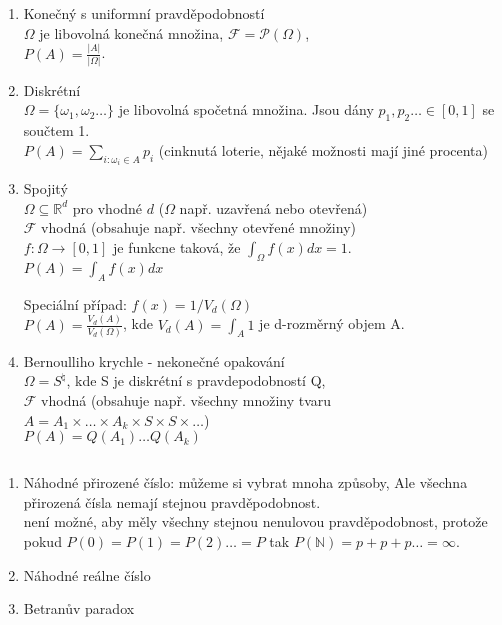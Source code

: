 \documentclass[../main.tex]{subfiles}
\begin{document}
\begin{example}
    $ $\\
    \begin{enumerate}
        \item 
        Konečný s uniformní pravděpodobností\\
        $\Omega$ je libovolná konečná množina, $\mathcal{F} = \mathcal{P}(\Omega)$,\\
        $P(A) = \frac{|A|}{|\Omega|}$.
        \item 
        Diskrétní\\
        $\Omega = \{\omega_1,\omega_2\dots\}$ je libovolná spočetná množina. Jsou dány $p_1,p_2\dots \in [0,1]$ se součtem 1.\\
        $P(A) = \sum_{i:\omega_i \in A} p_i$ (cinknutá loterie, nějaké možnosti mají jiné procenta)
        \item 
        Spojitý\\
        $\Omega \subseteq \mathbb{R}^d$ pro vhodné $d$ ($\Omega$ např. uzavřená nebo otevřená)\\
        $\mathcal{F}$ vhodná (obsahuje např. všechny otevřené množiny)\\
        $f:\Omega \rightarrow [0,1]$ je funkcne taková, že $\int_{\Omega} f(x)dx = 1$.\\
        $P(A) = \int_{A}f(x)dx$

        Speciální případ: $f(x) = 1/V_d(\Omega)$\\
        $P(A) = \frac{V_d(A)}{V_d(\Omega)}$, kde $V_d(A) = \int_A 1$ je d-rozměrný objem A.
        
        \item 
        Bernoulliho krychle - nekonečné opakování\\
        $\Omega = S^{\natural}$, kde S je diskrétní s pravdepodobností Q,\\
        $\mathcal{F}$ vhodná (obsahuje např. všechny množiny tvaru\\
        $A = A_1 \times \dots \times A_k \times S \times S \times \dots $)\\
        $P(A) = Q(A_1) \dots Q(A_k)$\\
    \end{enumerate}
\end{example}

\begin{example}[Nepříklady]
    $ $\\
    \begin{enumerate}
        \item Náhodné přirozené číslo: můžeme si vybrat mnoha způsoby, Ale všechna přirozená čísla nemají stejnou pravděpodobnost.\\
        není možné, aby měly všechny stejnou nenulovou pravděpodobnost, protože pokud $P(0) = P(1) = P(2)\dots = P$ tak $P(\mathbb{N}) = p + p + p\dots = \infty$.
        \item Náhodné reálne číslo
        \item Betranův paradox
    \end{enumerate}
\end{example}
\end{document}
